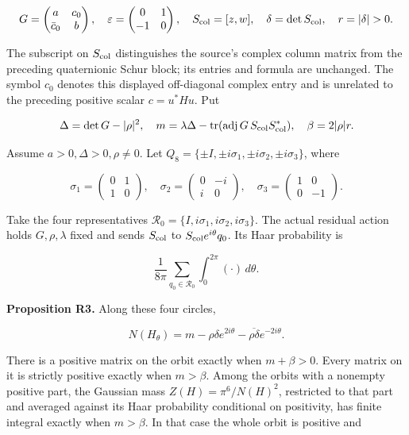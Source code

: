 \documentclass[
  11pt,
]{article}
\begin{document}
\[
G=\begin{pmatrix}a&c_0\\\bar c_0&b\end{pmatrix},\quad
\varepsilon=\begin{pmatrix}0&1\\-1&0\end{pmatrix},\quad
S_{\rm col}=[z,w],\quad \delta=\det S_{\rm col},\quad r=|\delta|>0.
\]

The subscript on \(S_{\rm col}\) distinguishes the source's complex
column matrix from the preceding quaternionic Schur block; its entries
and formula are unchanged. The symbol \(c_0\) denotes this displayed
off-diagonal complex entry and is unrelated to the preceding positive
scalar \(c=u^*Hu\). Put

\[
\Delta=\det G-|\rho|^2,\quad
m=\lambda\Delta-\operatorname{tr}(\operatorname{adj}G\,S_{\rm col}S_{\rm col}^*),\quad
\beta=2|\rho|r.
\]

Assume \(a>0,\Delta>0,\rho\ne0\). Let
\(Q_8=\{\pm I,\pm i\sigma_1,\pm i\sigma_2,\pm i\sigma_3\}\), where

\[
\sigma_1=\begin{pmatrix}0&1\\1&0\end{pmatrix},\quad
\sigma_2=\begin{pmatrix}0&-i\\i&0\end{pmatrix},\quad
\sigma_3=\begin{pmatrix}1&0\\0&-1\end{pmatrix}.
\]

Take the four representatives
\(\mathcal R_0=\{I,i\sigma_1,i\sigma_2,i\sigma_3\}\). The actual
residual action holds \(G,\rho,\lambda\) fixed and sends \(S_{\rm col}\)
to \(S_{\rm col}e^{i\theta}q_0\). Its Haar probability is

\[
\frac1{8\pi}\sum_{q_0\in\mathcal R_0}\int_0^{2\pi}(\cdot)\,d\theta.
\]

\textbf{Proposition R3.} Along these four circles,

\[
N(H_\theta)=m-\rho\delta e^{2i\theta}-\overline{\rho\delta}e^{-2i\theta}.
\]

There is a positive matrix on the orbit exactly when \(m+\beta>0\).
Every matrix on it is strictly positive exactly when \(m>\beta\). Among
the orbits with a nonempty positive part, the Gaussian mass
\(Z(H)=\pi^6/N(H)^2\), restricted to that part and averaged against its
Haar probability conditional on positivity, has finite integral exactly
when \(m>\beta\). In that case the whole orbit is positive and
\end{document}

